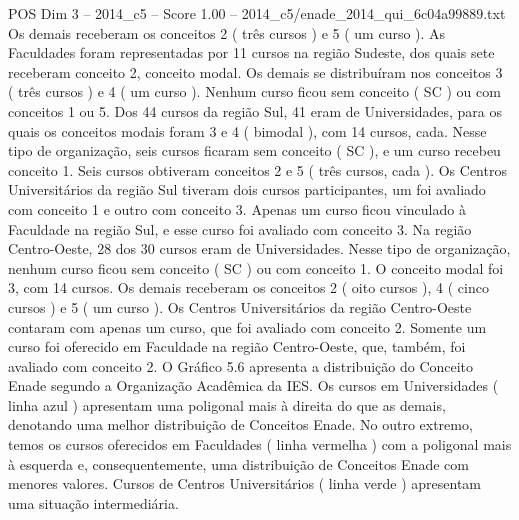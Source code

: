 \begin{textsample}{POS Dim 3 – 2014\_c5 – Score 1.00 – 2014\_c5/enade\_2014\_qui\_6c04a99889.txt}
Os demais receberam os conceitos 2 ( três cursos ) e 5 ( um curso ).
As Faculdades foram representadas por 11 cursos na região Sudeste, dos quais sete receberam conceito 2, conceito modal.
Os demais se distribuíram nos conceitos 3 ( três cursos ) e 4 ( um curso ).
Nenhum curso ficou sem conceito ( SC ) ou com conceitos 1 ou 5.
Dos 44 cursos da região Sul, 41 eram de Universidades, para os quais os conceitos modais foram 3 e 4 ( bimodal ), com 14 cursos, cada.
Nesse tipo de organização, seis cursos ficaram sem conceito ( SC ), e um curso recebeu conceito 1.
Seis cursos obtiveram conceitos 2 e 5 ( três cursos, cada ).
Os Centros Universitários da região Sul tiveram dois cursos participantes, um foi avaliado com conceito 1 e outro com conceito 3.
Apenas um curso ficou vinculado à Faculdade na região Sul, e esse curso foi avaliado com conceito 3.
Na região Centro-Oeste, 28 dos 30 cursos eram de Universidades.
Nesse tipo de organização, nenhum curso ficou sem conceito ( SC ) ou com conceito 1.
O conceito modal foi 3, com 14 cursos.
Os demais receberam os conceitos 2 ( oito cursos ), 4 ( cinco cursos ) e 5 ( um curso ).
Os Centros Universitários da região Centro-Oeste contaram com apenas um curso, que foi avaliado com conceito 2.
Somente um curso foi oferecido em Faculdade na região Centro-Oeste, que, também, foi avaliado com conceito 2.
O Gráfico 5.6 apresenta a distribuição do Conceito Enade segundo a Organização Acadêmica da IES.
Os cursos em Universidades ( linha azul ) apresentam uma poligonal mais à direita do que as demais, denotando uma melhor distribuição de Conceitos Enade.
No outro extremo, temos os cursos oferecidos em Faculdades ( linha vermelha ) com a poligonal mais à esquerda e, consequentemente, uma distribuição de Conceitos Enade com menores valores.
Cursos de Centros Universitários ( linha verde ) apresentam uma situação intermediária.

\end{textsample}
